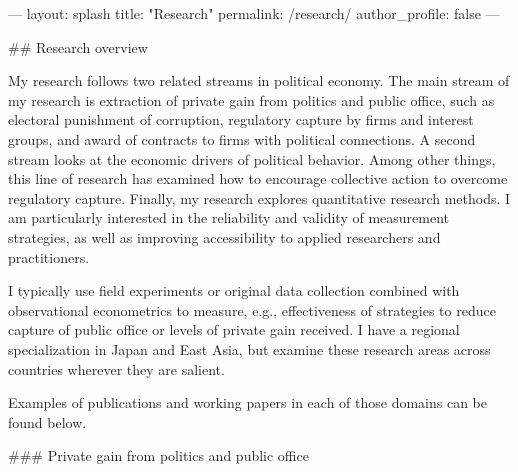 ---
layout: splash
title: "Research"
permalink: /research/
author_profile: false
---

## Research overview

My research follows two related streams in political economy. The main stream of my research is extraction of private gain from politics and public office, such as electoral punishment of corruption, regulatory capture by firms and interest groups, and award of contracts to firms with political connections. A second stream looks at the economic drivers of political behavior. Among other things, this line of research has examined how to encourage collective action to overcome regulatory capture. Finally, my research explores quantitative research methods. I am particularly interested in the reliability and validity of measurement strategies, as well as improving accessibility to applied researchers and practitioners. 

I typically use field experiments or original data collection combined with observational econometrics to measure, e.g., effectiveness of strategies to reduce capture of public office or levels of private gain received. I have a regional specialization in Japan and East Asia, but examine these research areas across countries wherever they are salient.

Examples of publications and working papers in each of those domains can be found below. 

### Private gain from politics and public office

